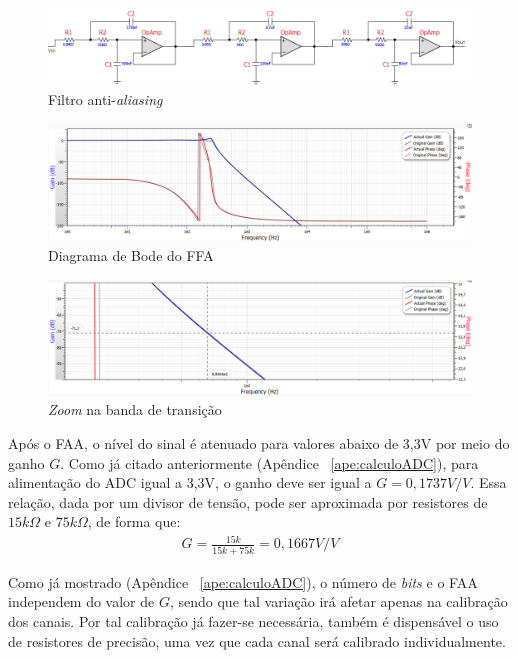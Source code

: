 \documentclass[
	12pt,				%
	openright,			%
	twoside,			%
	a4paper,			%
	english,			%
	french,				%
	spanish,			%
	brazil,				%
	]{abntex2}
\begin{document}
		\begin{figure}[!ht]
			\centering
			\includegraphics[width=\linewidth]{../Fotos/filterPro.png}
			\caption{Filtro anti-\textit{aliasing}}
			\label{fig:circuitoFAA}
		\end{figure}

		\begin{figure}[!ht]
			\centering
			\includegraphics[width=\linewidth]{../Fotos/filterProGF.png}
			\caption{Diagrama de Bode do FFA}
			\label{fig:faaDiagramaBode}
		\end{figure}

		\begin{figure}[!ht]
			\centering
			\includegraphics[width=\linewidth]{../Fotos/filterProZoom.png}
			\caption{\textit{Zoom} na banda de transição}
			\label{fig:faaDiagramaBodeZoom}
		\end{figure}

		Após o FAA, o nível do sinal é atenuado para valores abaixo de
		3,3V por meio do ganho $G$. Como já citado anteriormente (Apêndice ~\ref{ape:calculoADC}), para
		alimentação do ADC igual a 3,3V, o ganho deve ser igual a $G =
		0,1737V/V$. Essa relação, dada por um divisor de tensão, pode
		ser aproximada por resistores de $15k\Omega$ e $75k\Omega$, de
		forma que:
		\begin{gather*}
			G = \frac{15k}{15k+75k} = 0,1667V/V
		\end{gather*}

		Como já mostrado (Apêndice ~\ref{ape:calculoADC}), o número de \textit{bits} e o FAA independem do valor
		de $G$, sendo que tal variação irá afetar apenas na calibração dos
		canais. Por tal calibração já fazer-se necessária, também é
		dispensável o uso de resistores de precisão, uma vez que cada
		canal será calibrado individualmente.
\end{document}
